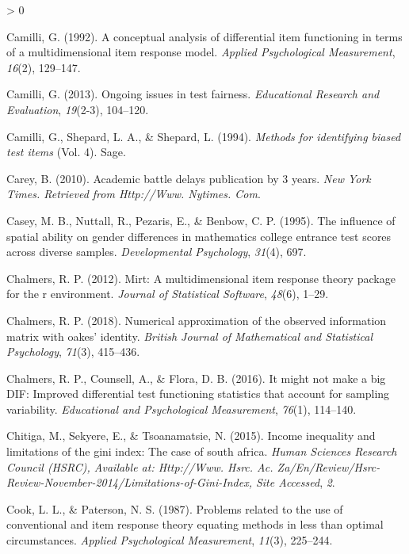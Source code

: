 \documentclass[
  english,
  man,floatsintext]{apa6}
\newlength{\cslhangindent}
\newenvironment{CSLReferences}[2] %
 {%
  \setlength{\parindent}{0pt}
  \ifodd #1 \everypar{\setlength{\hangindent}{\cslhangindent}}\ignorespaces\fi
  \ifnum #2 > 0
  \setlength{\parskip}{#2\baselineskip}
  \fi
 }%
 {}
\begin{document}
\begin{CSLReferences}{1}{0}
\leavevmode\hypertarget{ref-camilli1992conceptual}{}%
Camilli, G. (1992). A conceptual analysis of differential item functioning in terms of a multidimensional item response model. \emph{Applied Psychological Measurement}, \emph{16}(2), 129--147.

\leavevmode\hypertarget{ref-camilli2013ongoing}{}%
Camilli, G. (2013). Ongoing issues in test fairness. \emph{Educational Research and Evaluation}, \emph{19}(2-3), 104--120.

\leavevmode\hypertarget{ref-camilli1994methods}{}%
Camilli, G., Shepard, L. A., \& Shepard, L. (1994). \emph{Methods for identifying biased test items} (Vol. 4). Sage.

\leavevmode\hypertarget{ref-carey2010academic}{}%
Carey, B. (2010). Academic battle delays publication by 3 years. \emph{New York Times. Retrieved from Http://Www. Nytimes. Com}.

\leavevmode\hypertarget{ref-casey1995influence}{}%
Casey, M. B., Nuttall, R., Pezaris, E., \& Benbow, C. P. (1995). The influence of spatial ability on gender differences in mathematics college entrance test scores across diverse samples. \emph{Developmental Psychology}, \emph{31}(4), 697.

\leavevmode\hypertarget{ref-chalmers2012mirt}{}%
Chalmers, R. P. (2012). Mirt: A multidimensional item response theory package for the r environment. \emph{Journal of Statistical Software}, \emph{48}(6), 1--29.

\leavevmode\hypertarget{ref-chalmers2018numerical}{}%
Chalmers, R. P. (2018). Numerical approximation of the observed information matrix with oakes' identity. \emph{British Journal of Mathematical and Statistical Psychology}, \emph{71}(3), 415--436.

\leavevmode\hypertarget{ref-chalmers2016might}{}%
Chalmers, R. P., Counsell, A., \& Flora, D. B. (2016). It might not make a big DIF: Improved differential test functioning statistics that account for sampling variability. \emph{Educational and Psychological Measurement}, \emph{76}(1), 114--140.

\leavevmode\hypertarget{ref-chitiga2015income}{}%
Chitiga, M., Sekyere, E., \& Tsoanamatsie, N. (2015). Income inequality and limitations of the gini index: The case of south africa. \emph{Human Sciences Research Council (HSRC), Available at: Http://Www. Hsrc. Ac. Za/En/Review/Hsrc-Review-November-2014/Limitations-of-Gini-Index, Site Accessed}, \emph{2}.

\leavevmode\hypertarget{ref-cook1987problems}{}%
Cook, L. L., \& Paterson, N. S. (1987). Problems related to the use of conventional and item response theory equating methods in less than optimal circumstances. \emph{Applied Psychological Measurement}, \emph{11}(3), 225--244.


\end{CSLReferences}
\end{document}
